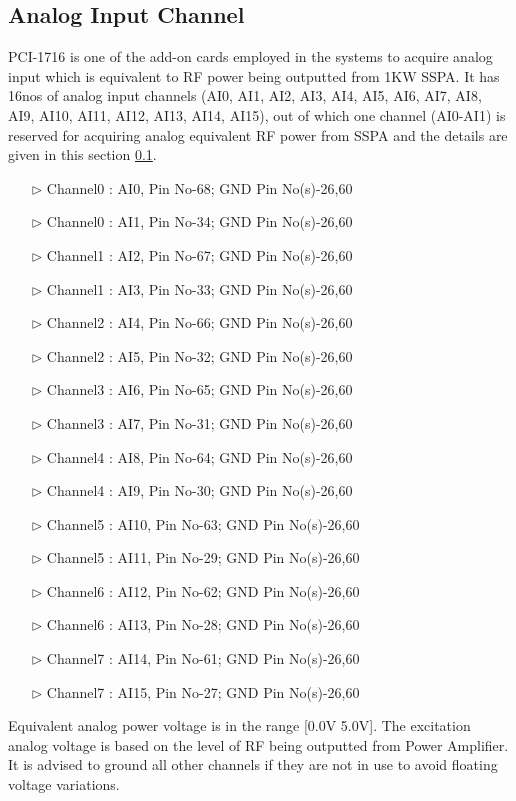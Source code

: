 \subsection{Analog Input Channel}
\label{SectionAI}
PCI-1716 is one of the add-on cards  employed in the systems to acquire analog input which is equivalent to RF power being outputted from 1KW SSPA. It has 16nos of analog input channels (AI0, AI1, AI2, AI3, AI4, AI5, AI6, AI7, AI8, AI9, AI10, AI11, AI12, AI13, AI14, AI15), out of which one channel (AI0-AI1) is reserved for acquiring analog equivalent RF power from SSPA and the details are given in this section \ref{SectionAI}.
\begin{enumerate}
	\item [$\rhd$] Channel0 : AI0, Pin No-68; GND Pin No(s)-26,60
	\item [$\rhd$] Channel0 : AI1, Pin No-34; GND Pin No(s)-26,60
	\item [$\rhd$] Channel1 : AI2, Pin No-67; GND Pin No(s)-26,60
	\item [$\rhd$] Channel1 : AI3, Pin No-33; GND Pin No(s)-26,60
	\item [$\rhd$] Channel2 : AI4, Pin No-66; GND Pin No(s)-26,60
	\item [$\rhd$] Channel2 : AI5, Pin No-32; GND Pin No(s)-26,60
	\item [$\rhd$] Channel3 : AI6, Pin No-65; GND Pin No(s)-26,60
	\item [$\rhd$] Channel3 : AI7, Pin No-31; GND Pin No(s)-26,60
	\item [$\rhd$] Channel4 : AI8, Pin No-64; GND Pin No(s)-26,60
	\item [$\rhd$] Channel4 : AI9, Pin No-30; GND Pin No(s)-26,60
	\item [$\rhd$] Channel5 : AI10, Pin No-63; GND Pin No(s)-26,60
	\item [$\rhd$] Channel5 : AI11, Pin No-29; GND Pin No(s)-26,60
	\item [$\rhd$] Channel6 : AI12, Pin No-62; GND Pin No(s)-26,60
	\item [$\rhd$] Channel6 : AI13, Pin No-28; GND Pin No(s)-26,60
	\item [$\rhd$] Channel7 : AI14, Pin No-61; GND Pin No(s)-26,60
	\item [$\rhd$] Channel7 : AI15, Pin No-27; GND Pin No(s)-26,60
\end{enumerate}
Equivalent analog power voltage is in the range [0.0V 5.0V]. The excitation analog voltage is based on the level of RF being outputted from Power Amplifier. It is advised to ground all other channels if they are not in use to avoid floating voltage variations.

